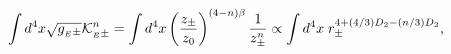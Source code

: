 \begin{equation}
        \label{5dlocalop}
        \int d^4x \sqrt{g_{{}_E\pm}} {\cal K}_{{}_E\pm}^n
        =\int d^4x \left({z_\pm\over z_0}\right)^{ (4-n) \beta }
                {1\over z_\pm^{n}}
        \propto\int d^4x \; r_\pm^{4+(4 /3) D_2 - (n/3) D_2} ,
\end{equation}

